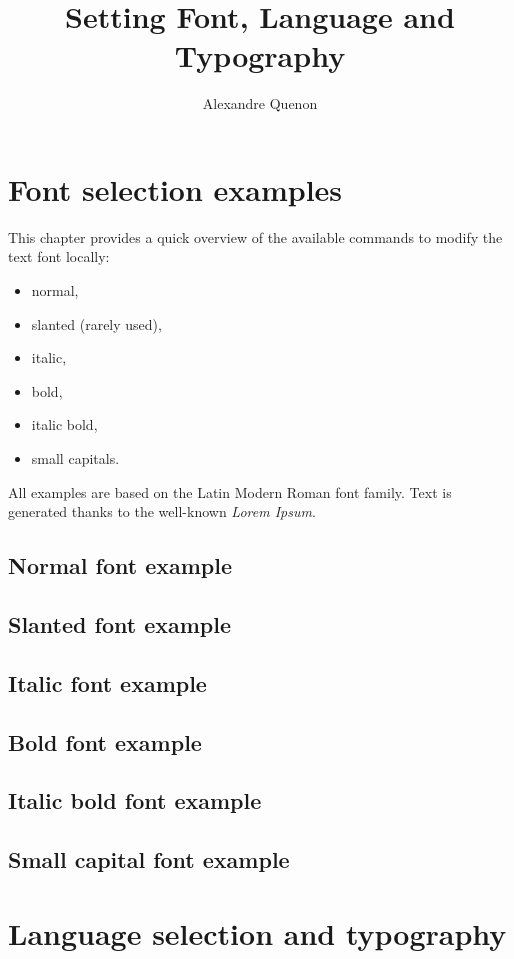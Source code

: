 \documentclass[11pt, a4paper]{report}
\title{Setting Font, Language and Typography}
\author{Alexandre Quenon}
\begin{document}

\maketitle

\tableofcontents


\chapter{Font selection examples}

	This chapter provides a quick overview of the available commands to modify the text font locally:
	\begin{itemize}
		\item normal,
		\item slanted (rarely used),
		\item italic,
		\item bold,
		\item italic bold,
		\item small capitals.
	\end{itemize}

	All examples are based on the Latin Modern Roman font family.
	Text is generated thanks to the well-known \textit{Lorem Ipsum}.


	\section{Normal font example}
	
		\lipsum[1]
		
	
	\section{Slanted font example}
	
		\textsl{\lipsum[1]}
	
	
	\section{Italic font example}
	
		\textit{\lipsum[1]}
		
	
	\section{Bold font example}
	
		\textbf{\lipsum[1]}
	
	
	\section{Italic bold font example}
	
		\textbf{\textit{\lipsum[1]}}
		
	
	\section{Small capital font example}
	
		\textsc{\lipsum[1]}
	

\chapter{Language selection and typography}


\end{document}
